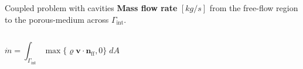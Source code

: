 \documentclass{beamer}
\begin{document}
\begin{frame}{Coupled problem with cavities}
\textbf{Mass flow rate} $[\si{kg/s}]$ from the free-flow region to the porous-medium across $\Gamma_\text{int}$.
\begin{columns}
	\begin{equation*}
	\dot{m} = \int_{\Gamma_\text{int}} \max \{ \varrho \mathbf{v} \cdot 
	\mathbf{n}_\text{ff} , 0 \} \; dA
	\end{equation*}
	\begin{figure}
		\centering
		
	\end{figure}
\end{columns}
\end{frame}
\end{document}
